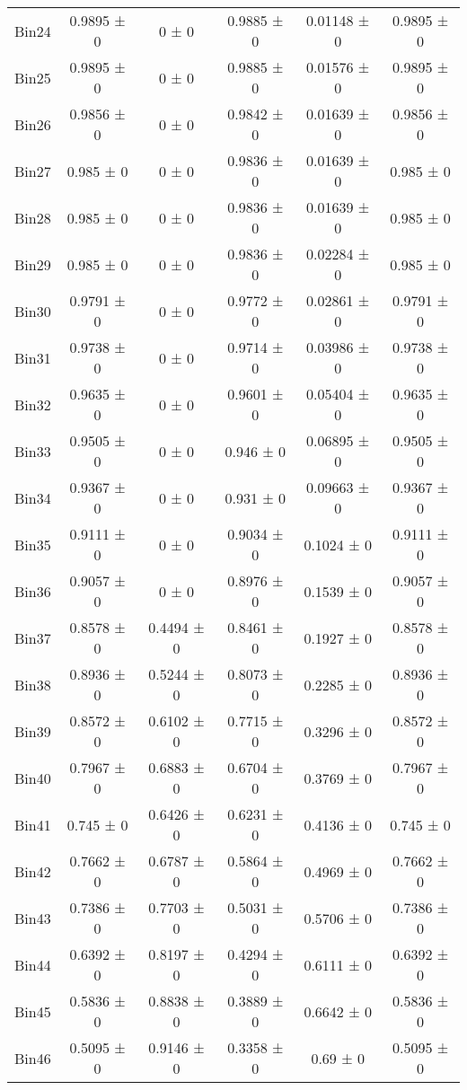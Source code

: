 \begin{tabular}{@{\extracolsep{4pt}}lccccc@{}}
     Bin24 & 0.9895 ± 0 & 0 ± 0 & 0.9885 ± 0 & 0.01148 ± 0 & 0.9895 ± 0 \\ 
     Bin25 & 0.9895 ± 0 & 0 ± 0 & 0.9885 ± 0 & 0.01576 ± 0 & 0.9895 ± 0 \\ 
     Bin26 & 0.9856 ± 0 & 0 ± 0 & 0.9842 ± 0 & 0.01639 ± 0 & 0.9856 ± 0 \\ 
     Bin27 & 0.985 ± 0 & 0 ± 0 & 0.9836 ± 0 & 0.01639 ± 0 & 0.985 ± 0 \\ 
     Bin28 & 0.985 ± 0 & 0 ± 0 & 0.9836 ± 0 & 0.01639 ± 0 & 0.985 ± 0 \\ 
     Bin29 & 0.985 ± 0 & 0 ± 0 & 0.9836 ± 0 & 0.02284 ± 0 & 0.985 ± 0 \\ 
     Bin30 & 0.9791 ± 0 & 0 ± 0 & 0.9772 ± 0 & 0.02861 ± 0 & 0.9791 ± 0 \\ 
     Bin31 & 0.9738 ± 0 & 0 ± 0 & 0.9714 ± 0 & 0.03986 ± 0 & 0.9738 ± 0 \\ 
     Bin32 & 0.9635 ± 0 & 0 ± 0 & 0.9601 ± 0 & 0.05404 ± 0 & 0.9635 ± 0 \\ 
     Bin33 & 0.9505 ± 0 & 0 ± 0 & 0.946 ± 0 & 0.06895 ± 0 & 0.9505 ± 0 \\ 
     Bin34 & 0.9367 ± 0 & 0 ± 0 & 0.931 ± 0 & 0.09663 ± 0 & 0.9367 ± 0 \\ 
     Bin35 & 0.9111 ± 0 & 0 ± 0 & 0.9034 ± 0 & 0.1024 ± 0 & 0.9111 ± 0 \\ 
     Bin36 & 0.9057 ± 0 & 0 ± 0 & 0.8976 ± 0 & 0.1539 ± 0 & 0.9057 ± 0 \\ 
     Bin37 & 0.8578 ± 0 & 0.4494 ± 0 & 0.8461 ± 0 & 0.1927 ± 0 & 0.8578 ± 0 \\ 
     Bin38 & 0.8936 ± 0 & 0.5244 ± 0 & 0.8073 ± 0 & 0.2285 ± 0 & 0.8936 ± 0 \\ 
     Bin39 & 0.8572 ± 0 & 0.6102 ± 0 & 0.7715 ± 0 & 0.3296 ± 0 & 0.8572 ± 0 \\ 
     Bin40 & 0.7967 ± 0 & 0.6883 ± 0 & 0.6704 ± 0 & 0.3769 ± 0 & 0.7967 ± 0 \\ 
     Bin41 & 0.745 ± 0 & 0.6426 ± 0 & 0.6231 ± 0 & 0.4136 ± 0 & 0.745 ± 0 \\ 
     Bin42 & 0.7662 ± 0 & 0.6787 ± 0 & 0.5864 ± 0 & 0.4969 ± 0 & 0.7662 ± 0 \\ 
     Bin43 & 0.7386 ± 0 & 0.7703 ± 0 & 0.5031 ± 0 & 0.5706 ± 0 & 0.7386 ± 0 \\ 
     Bin44 & 0.6392 ± 0 & 0.8197 ± 0 & 0.4294 ± 0 & 0.6111 ± 0 & 0.6392 ± 0 \\ 
     Bin45 & 0.5836 ± 0 & 0.8838 ± 0 & 0.3889 ± 0 & 0.6642 ± 0 & 0.5836 ± 0 \\ 
     Bin46 & 0.5095 ± 0 & 0.9146 ± 0 & 0.3358 ± 0 & 0.69 ± 0 & 0.5095 ± 0 \\ 

\end{tabular}
